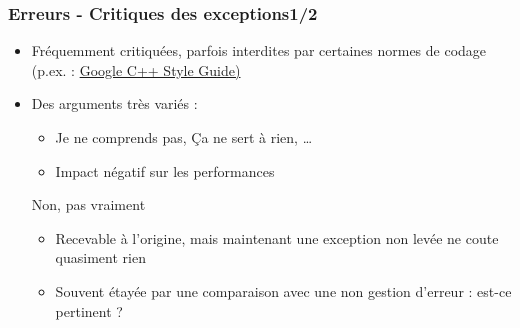 \documentclass[C++.tex]{subfiles}
\begin{document}
\begin{frame}
	\frametitle{Erreurs - Critiques des exceptions\titlehfill{}1/2}
	\begin{itemize}
		\item Fréquemment critiquées, parfois interdites par certaines normes de codage (p.ex. : \href{https://google.github.io/styleguide/cppguide.html}{Google C++ Style Guide)}
		\item Des arguments très variés :
		\begin{itemize}
			\item \og Je ne comprends pas\fg{}, \og Ça ne sert à rien\fg{}, \ldots
			\item Impact négatif sur les performances
		\end{itemize}

		\pause

		\begin{block}{Non, pas vraiment}
			\begin{itemize}
				\item Recevable à l'origine, mais maintenant une exception non levée ne coute quasiment rien
				\item Souvent étayée par une comparaison avec une non gestion d'erreur : est-ce pertinent ? 
			\end{itemize}
		\end{block}
	\end{itemize}
\end{frame}
\end{document}
